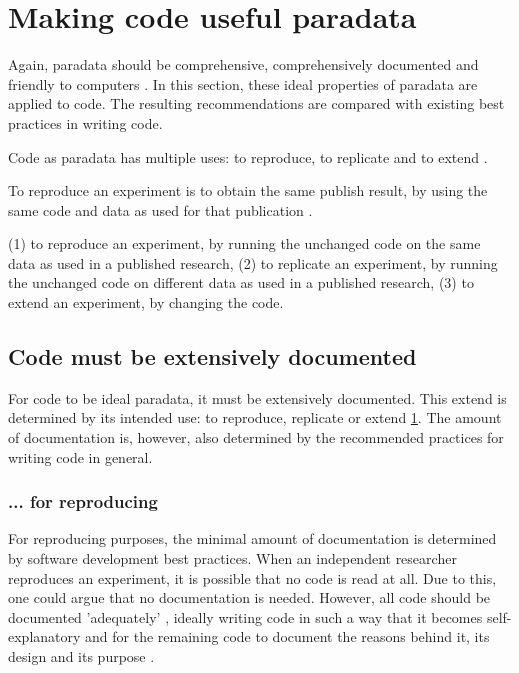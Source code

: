 \section{Making code useful paradata}\label{sec:making-code-useful-paradata}

Again, paradata should be comprehensive, comprehensively documented
and friendly to computers \cite{huvila2022improving}.
In this section, these ideal properties of paradata are applied to code.
The resulting recommendations are compared with
existing best practices in writing code.

Code as paradata has multiple uses: to reproduce, to replicate and to 
extend \cite{benureau2018re}.

To reproduce an experiment is to obtain the same publish result,
by using the same code and data as used for that publication 
\cite{peng2006reproducible}.

(1) to reproduce an experiment, by running the unchanged code on the same data as
used in a published research,
(2) to replicate an experiment, by running the unchanged code on different data as
used in a published research,
(3) to extend an experiment, by changing the code.

\subsection{Code must be extensively documented}

For code to be ideal paradata, it must be extensively documented.
This extend is determined by its intended use: 
to reproduce, replicate or extend \ref{sec:making-code-useful-paradata}.
The amount of documentation is, however, also determined
by the recommended practices for writing code in general. 

\subsubsection{... for reproducing}

For reproducing purposes, the minimal amount of documentation
is determined by software development best practices.
When an independent researcher reproduces an experiment, 
it is possible that no code is read at all.
Due to this, one could argue that no documentation is needed.
However, all code should be documented 'adequately' \cite{peng2006reproducible},
ideally writing code in such a way that it becomes self-explanatory \cite{wilson2014best}
and for the remaining code to document the reasons behind it, 
its design and its purpose \cite{wilson2014best}.

